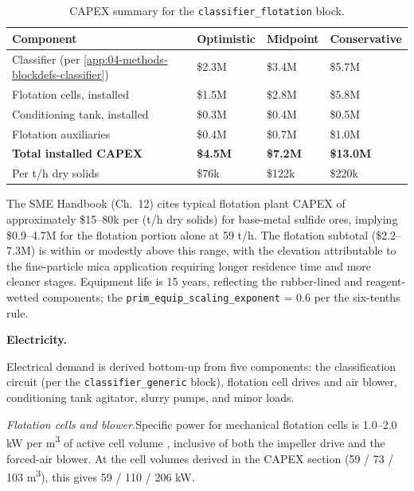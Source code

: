 \begin{table}[h!]
\caption{CAPEX summary for the \texttt{classifier\_flotation} block.}
\centering
\begin{tabular}{>{\raggedright\arraybackslash}p{5.2cm}
				>{\raggedright\arraybackslash}p{2.5cm}
				>{\raggedright\arraybackslash}p{2.5cm}
				>{\raggedright\arraybackslash}p{2.5cm}}
\toprule
\textbf{Component} & \textbf{Optimistic} & \textbf{Midpoint} & \textbf{Conservative} \\
\midrule
Classifier (per \ref{app:04-methods-blockdefs-classifier}) & \$2.3M & \$3.4M & \$5.7M \\
Flotation cells, installed & \$1.5M & \$2.8M & \$5.8M \\
Conditioning tank, installed & \$0.3M & \$0.4M & \$0.5M \\
Flotation auxiliaries & \$0.4M & \$0.7M & \$1.0M \\
\midrule
\textbf{Total installed CAPEX} & \textbf{\$4.5M} & \textbf{\$7.2M} & \textbf{\$13.0M} \\
Per t/h dry solids & \$76k & \$122k & \$220k \\
\bottomrule
\end{tabular}
\end{table}
 
\noindent The SME Handbook (Ch.\ 12) cites typical flotation plant CAPEX of approximately \$15--80k per (t/h dry solids) for base-metal sulfide ores, implying \$0.9--4.7M for the flotation portion alone at 59 t/h. The flotation subtotal (\$2.2--7.3M) is within or modestly above this range, with the elevation attributable to the fine-particle mica application requiring longer residence time and more cleaner stages. Equipment life is 15 years, reflecting the rubber-lined and reagent-wetted components; the \texttt{prim\_equip\_scaling\_exponent} = 0.6 per the six-tenths rule. 


\medskip
\noindent\textbf{Electricity.}\quad
 
Electrical demand is derived bottom-up from five components: the classification circuit (per the \texttt{classifier\_generic} block), flotation cell drives and air blower, conditioning tank agitator, slurry pumps, and minor loads.
 
\medskip
\noindent\textit{Flotation cells and blower.}\quad Specific power for mechanical flotation cells is 1.0--2.0 kW per \si{m^3} of active cell volume \citep{arfaniaCostModellingFlotation2017}, inclusive of both the impeller drive and the forced-air blower. At the cell volumes derived in the CAPEX section (59 / 73 / 103 \si{m^3}), this gives 59 / 110 / 206 kW.
 
